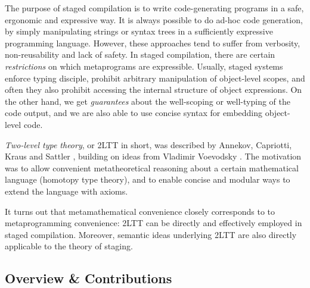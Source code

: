 \documentclass[acmsmall]{acmart}
\theoremstyle{remark}
\begin{document}
The purpose of staged compilation is to write code-generating programs in a
safe, ergonomic and expressive way. It is always possible to do ad-hoc code
generation, by simply manipulating strings or syntax trees in a sufficiently
expressive programming language. However, these approaches tend to suffer from
verbosity, non-reusability and lack of safety. In staged compilation, there are
certain \emph{restrictions} on which metaprograms are expressible. Usually,
staged systems enforce typing disciple, prohibit arbitrary manipulation of
object-level scopes, and often they also prohibit accessing the internal
structure of object expressions. On the other hand, we get \emph{guarantees}
about the well-scoping or well-typing of the code output, and we are also able
to use concise syntax for embedding object-level code.

\emph{Two-level type theory}, or 2LTT in short, was described by Annekov,
Capriotti, Kraus and Sattler \cite{twolevel}, building on ideas from Vladimir
Voevodsky \cite{hts}. The motivation was to allow convenient metatheoretical
reasoning about a certain mathematical language (homotopy type theory), and to
enable concise and modular ways to extend the language with axioms.

It turns out that metamathematical convenience closely corresponds to to
metaprogramming convenience: 2LTT can be directly and effectively employed
in staged compilation. Moreover, semantic ideas underlying 2LTT are also
directly applicable to the theory of staging.

\subsection{Overview \& Contributions}
\end{document}
